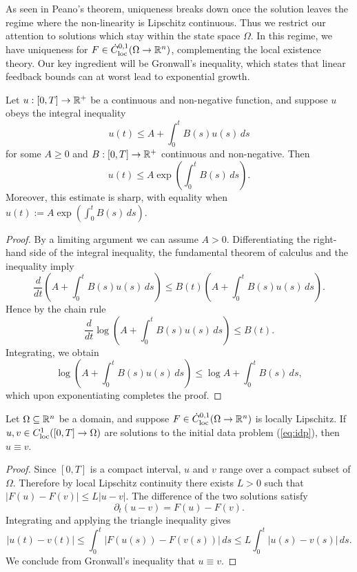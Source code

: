 As seen in Peano's theorem, uniqueness breaks down once the solution leaves the regime where the non-linearity is Lipschitz continuous. Thus we restrict our attention to solutions which stay within the state space $\Omega$. In this regime, we have uniqueness for $F \in \dot C^{0, 1}_{\mathrm{loc}} (\Omega \to \mathbb R^n)$, complementing the local existence theory. Our key ingredient will be Gronwall's inequality, which states that linear feedback bounds can at worst lead to exponential growth. 

\begin{lemma}
	Let $u: [0, T] \to \mathbb R^+$ be a continuous and non-negative function, and suppose $u$ obeys the integral inequality
		\[ u(t) \leq A + \int_0^t B(s) u(s) \, ds \]
	for some $A \geq 0$ and $B :[0, T] \to \mathbb R^+$ continuous and non-negative. Then 
		\[ u(t) \leq A \exp \left( \int_0^t B(s) \,ds \right). \]	
	Moreover, this estimate is sharp, with equality when $u(t) := A \exp (\int_0^t B(s) \, ds)$. 	
\end{lemma}

\begin{proof}
	By a limiting argument we can assume $A > 0$. Differentiating the right-hand side of the integral inequality, the fundamental theorem of calculus and the inequality imply
		\[ \frac{d}{dt} \left(A + \int_0^t B(s) u(s) \, ds \right) \leq B(t) \left( A + \int_0^t B(s) u(s) \, ds \right) .\]
	Hence by the chain rule
		\[ \frac{d}{dt} \log \left(  A + \int_0^t B(s) u(s) \, ds  \right) \leq B(t). \]	
	Integrating, we obtain
		\[  \log \left(  A + \int_0^t B(s) u(s) \, ds  \right) \leq \log A + \int_0^t B(s) \, ds, \]
	which upon exponentiating completes the proof. 		
\end{proof}

\begin{theorem}
	Let $\Omega \subseteq \mathbb R^n$ be a domain, and suppose $F \in \dot C^{0, 1}_{\mathrm{loc}} (\Omega \to \mathbb R^n)$ is locally Lipschitz. If $u, v \in C^1_{\mathrm{loc}} ([0, T] \to \Omega)$ are solutions to the initial data problem (\ref{eq:idp}), then $u \equiv v$. 
\end{theorem}

\begin{proof}
	Since $[0, T]$ is a compact interval, $u$ and $v$ range over a compact subset of $\Omega$. Therefore by local Lipschitz continuity there exists $L > 0$ such that $|F(u) - F(v)| \leq L |u - v|$. The difference of the two solutions satisfy
		\[ \partial_t (u - v) = F(u) - F(v).\]
	Integrating and applying the triangle inequality gives 
		\[ |u(t) - v(t)| \leq \int_0^t |F(u(s)) - F(v(s))| \, ds \leq L \int_0^t |u(s) - v(s)| \, ds .\]
	We conclude from Gronwall's inequality that $u \equiv v$. 	
\end{proof}